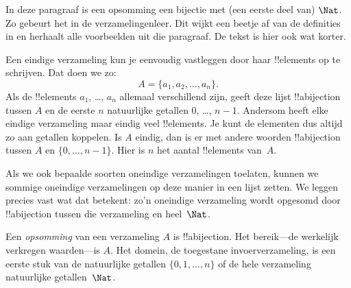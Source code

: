 \documentclass[openany]{memoir}
\begin{document}
\begingroup
\def\olfilename{OLP-0038}
\def\olfilepath{content/sets-functions-relations/size-of-sets/}
\hypertarget{unit-OLP-0038}{}





\begin{editorial}
  In deze paragraaf is een opsomming een bijectie met (een eerste deel
  van) $\Nat$. Zo gebeurt het in de verzamelingenleer. Dit wijkt een
  beetje af van de definities in  en herhaalt alle
  voorbeelden uit die paragraaf. De tekst is hier ook wat korter.
\end{editorial}

Een eindige verzameling kun je eenvoudig vastleggen door haar
!!{element}s op te schrijven. Dat doen we zo:
\[
  A = \{a_1, a_2, \ldots, a_n\}.
\]
Als de !!{element}s $a_1$, \dots, $a_n$ allemaal verschillend zijn,
geeft deze lijst !!a{bijection} tussen $A$ en de eerste $n$
natuurlijke getallen $0$, \dots, $n-1$. Andersom heeft elke eindige
verzameling maar eindig veel !!{element}s. Je kunt de elementen dus
altijd zo aan getallen koppelen. Is $A$ eindig, dan is er met andere
woorden !!a{bijection} tussen $A$ en $\{0, \dots, n-1\}$. Hier is $n$
het aantal !!{element}s van~$A$.

Als we ook bepaalde soorten oneindige verzamelingen toelaten, kunnen
we sommige oneindige verzamelingen op deze manier in een lijst zetten.
We leggen precies vast wat dat betekent: zo'n oneindige verzameling
wordt opgesomd door !!a{bijection} tussen die verzameling en
heel~$\Nat$.

\begin{defn}
Een \emph{opsomming} van een verzameling $A$ is !!a{bijection}. Het
bereik---de werkelijk verkregen waarden---is $A$. Het domein, de
toegestane invoerverzameling, is een eerste stuk van de natuurlijke
getallen $\{0, 1, \ldots, n\}$ {of} de hele verzameling natuurlijke
getallen~$\Nat$.
\end{defn}
\end{document}
